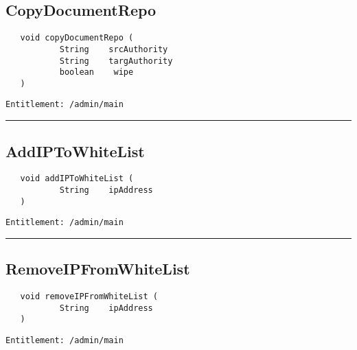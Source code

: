 \subsection{CopyDocumentRepo}
\label{Api:CopyDocumentRepo}
\begin{Verbatim}
   void copyDocumentRepo (
           String    srcAuthority
           String    targAuthority
           boolean    wipe
   )
\end{Verbatim}
\begin{Verbatim}[formatcom=\color{Maroon}]
  Entitlement: /admin/main
\end{Verbatim}



\rule{12cm}{2pt}
\subsection{AddIPToWhiteList}
\label{Api:AddIPToWhiteList}
\begin{Verbatim}
   void addIPToWhiteList (
           String    ipAddress
   )
\end{Verbatim}
\begin{Verbatim}[formatcom=\color{Maroon}]
  Entitlement: /admin/main
\end{Verbatim}



\rule{12cm}{2pt}
\subsection{RemoveIPFromWhiteList}
\label{Api:RemoveIPFromWhiteList}
\begin{Verbatim}
   void removeIPFromWhiteList (
           String    ipAddress
   )
\end{Verbatim}
\begin{Verbatim}[formatcom=\color{Maroon}]
  Entitlement: /admin/main
\end{Verbatim}



